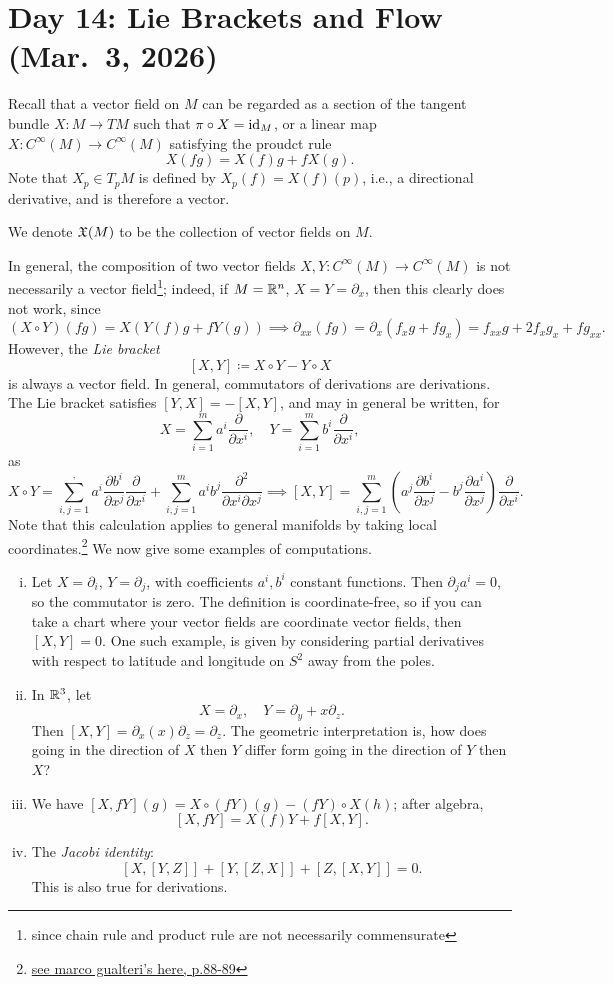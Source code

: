 \section{Day 14: Lie Brackets and Flow (Mar.\ 3, 2026)}
Recall that a vector field on $M$ can be regarded as a section of the tangent bundle $X \colon M \to TM$ such that $\pi \circ X = \mathrm{id}_M$, or a linear map $X \colon C^\infty(M) \to C^\infty(M)$ satisfying the proudct rule
\[ X(fg) = X(f) g + f X(g). \]
Note that $X_p \in T_p M$ is defined by $X_p (f) = X(f)(p)$, i.e., a directional derivative, and is therefore a vector.
\begin{definition}
    We denote $\mathfrak X(M)$ to be the collection of vector fields on $M$. 
\end{definition}
In general, the composition of two vector fields $X, Y \colon C^\infty(M) \to C^\infty(M)$ is not necessarily a vector field\footnote{since chain rule and product rule are not necessarily commensurate}; indeed, if $M = \mathbb R^n$, $X = Y = \partial_x$, then this clearly does not work, since
\[ (X \circ Y)(fg) = X(Y(f) g + f Y(g)) \implies \partial_{xx} (fg) = \partial_x (f_x g + f g_x) = f_{xx} g + 2 f_x g_x + f g_{xx}. \]
However, the \textit{Lie bracket}
\[ [X, Y] \coloneq X \circ Y - Y \circ X \]
is always a vector field. In general, commutators of derivations are derivations. The Lie bracket satisfies $[Y, X] = -[X, Y]$, and may in general be written, for
\[ X = \sum_{i=1}^m a^i \frac{\partial}{\partial x^i}, \quad Y = \sum_{i=1}^m b^i \frac{\partial}{\partial x^i}, \]
as
\[ X \circ Y = \sum_{i,j=1}^, a^i \frac{\partial b^i}{\partial x^j} \frac{\partial}{\partial x^i} + \sum_{i,j=1}^m a^i b^j \frac{\partial^2}{\partial x^i \partial x^j} \implies [X, Y] = \sum_{i,j=1}^m \left(a^j \frac{\partial b^i}{\partial x^j} - b^j \frac{\partial a^i}{\partial x^j}\right) \frac{\partial}{\partial x^i}. \]
Note that this calculation applies to general manifolds by taking local coordinates.\footnote{\href{https://www.math.utoronto.ca/mgualt/courses/18-367/docs/DiffGeomNotes-9.pdf}{see marco gualteri's here, p.88-89}} We now give some examples of computations.
\begin{enumerate}[(i)]
    \item Let $X = \partial_i$, $Y = \partial_j$, with coefficients $a^i, b^i$ constant functions. Then $\partial_j a^i = 0$, so the commutator is zero. The definition is coordinate-free, so if you can take a chart where your vector fields are coordinate vector fields, then $[X, Y] = 0$. One such example, is given by considering partial derivatives with respect to latitude and longitude on $S^2$ away from the poles.
    \item In $\mathbb R^3$, let
    \[ X = \partial_x, \quad Y = \partial_y + x \partial_z. \]
    Then $[X, Y] = \partial_x(x) \partial_z = \partial_z$. The geometric interpretation is, how does going in the direction of $X$ then $Y$ differ form going in the direction of $Y$ then $X$?
    \item We have $[X, fY](g) = X \circ (fY)(g) - (fY) \circ X(h)$; after algebra,
    \[ [X, fY] = X(f) Y + f[X, Y]. \]
    \item The \textit{Jacobi identity}:
    \[ [X, [Y, Z]] + [Y, [Z, X]] + [Z, [X, Y]] = 0. \]
    This is also true for derivations.
\end{enumerate}

